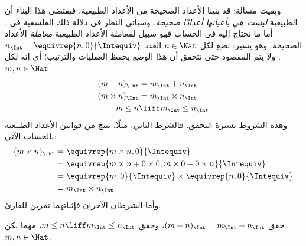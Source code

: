 \documentclass[../../../include/open-logic-section]{subfiles}
\begin{document}
وبقيت مسألة: قد بنينا الأعداد الصحيحة من الأعداد الطبيعية، فيقتضي هذا البناء أن الطبيعية \emph{ليست هي بأعيانها أعدادًا صحيحة}. وسيأتي النظر في دلالة ذلك الفلسفية في . أما ما نحتاج إليه في الحساب فهو سبيل لمعاملة الأعداد الطبيعية \emph{معاملة} الأعداد الصحيحة. وهو يسير: نضع لكل $n \in \Nat$ العدد $n_\Int = \equivrep{n, 0}{\Intequiv}$. ولا يتم المقصود حتى نتحقق أن هذا الوضع يحفظ العمليات والترتيب؛ أي إنه لكل $m, n
\in \Nat$
\begin{align*}
	(m + n)_\Int &= m_\Int + n_\Int\\
	(m \times n)_\Int &= m_\Int \times n_\Int\\
	m \leq n &\liff m_\Int \leq n_\Int
\end{align*}
وهذه الشروط يسيرة التحقق. فالشرط الثاني، مثلًا، ينتج من قوانين الأعداد الطبيعية بالحساب الآتي:
	\begin{align*}
		(m \times n)_\Int  &= \equivrep{m \times n, 0}{\Intequiv} \\
		&= \equivrep{m \times n + 0 \times 0, m \times 0 + 0 \times n}{\Intequiv} \\
		&= \equivrep{m, 0}{\Intequiv} \times \equivrep{n, 0}{\Intequiv} \\
		&= m_\Int \times n_\Int
	\end{align*}
وأما الشرطان الآخران فإثباتهما تمرين للقارئ.
\begin{prob}
	حقق $(m + n)_\Int = m_\Int + n_\Int$، وحقق
	$m \leq n \liff m_\Int \leq n_\Int$، مهما يكن $m, n \in \Nat$.
\end{prob}
\end{document}
